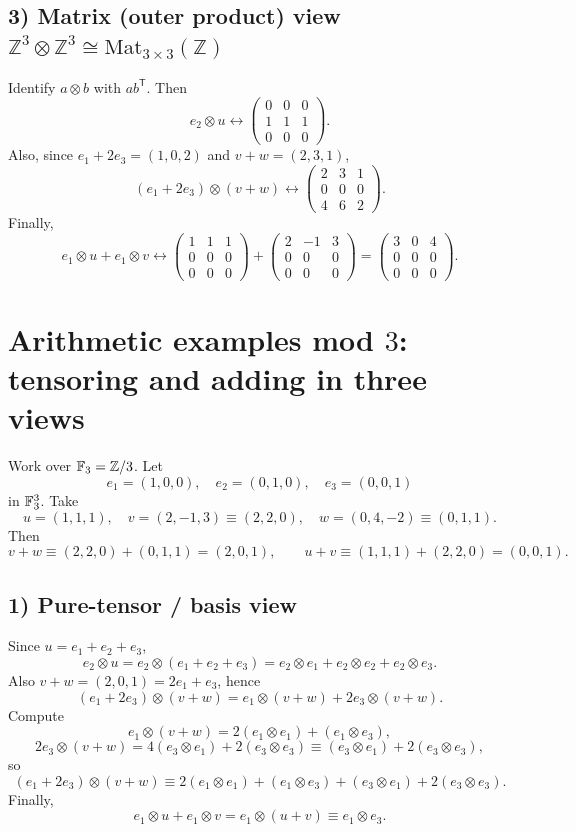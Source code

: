\documentclass[12pt,a4paper]{article}
\theoremstyle{plain}
\theoremstyle{definition}      %
\begin{document}
\subsection*{3) Matrix (outer product) view \(\mathbb Z^3\otimes \mathbb Z^3 \cong \mathrm{Mat}_{3\times 3}(\mathbb Z)\)}
Identify \(a\otimes b\) with \(ab^{\mathsf T}\). Then
\[
e_2\otimes u \leftrightarrow
\begin{pmatrix}
	0&0&0\\
	1&1&1\\
	0&0&0
\end{pmatrix}.
\]
Also, since \(e_1+2e_3=(1,0,2)\) and \(v+w=(2,3,1)\),
\[
(e_1+2e_3)\otimes(v+w)\leftrightarrow
\begin{pmatrix}
	2&3&1\\
	0&0&0\\
	4&6&2
\end{pmatrix}.
\]
Finally,
\[
e_1\otimes u + e_1\otimes v \leftrightarrow
\begin{pmatrix}
	1&1&1\\0&0&0\\0&0&0
\end{pmatrix}
+
\begin{pmatrix}
	2&-1&3\\0&0&0\\0&0&0
\end{pmatrix}
=
\begin{pmatrix}
	3&0&4\\0&0&0\\0&0&0
\end{pmatrix}.
\]

\section*{Arithmetic examples mod \(3\): tensoring and adding in three views}

Work over \(\Bbb F_3=\mathbb Z/3\). Let
\[
e_1=(1,0,0),\quad e_2=(0,1,0),\quad e_3=(0,0,1)
\]
in \(\Bbb F_3^3\). Take
\[
u=(1,1,1),\quad v=(2,-1,3)\equiv(2,2,0),\quad w=(0,4,-2)\equiv(0,1,1).
\]
Then
\[
v+w\equiv(2,2,0)+(0,1,1)=(2,0,1),\qquad
u+v\equiv(1,1,1)+(2,2,0)=(0,0,1).
\]

\subsection*{1) Pure-tensor / basis view}
Since \(u=e_1+e_2+e_3\),
\[
e_2\otimes u
= e_2\otimes(e_1+e_2+e_3)
= e_2\otimes e_1+e_2\otimes e_2+e_2\otimes e_3.
\]
Also \(v+w=(2,0,1)=2e_1+e_3\), hence
\[
(e_1+2e_3)\otimes(v+w)
= e_1\otimes(v+w)+2e_3\otimes(v+w).
\]
Compute
\[
e_1\otimes(v+w)=2(e_1\otimes e_1)+(e_1\otimes e_3),
\]
\[
2e_3\otimes(v+w)=4(e_3\otimes e_1)+2(e_3\otimes e_3)\equiv (e_3\otimes e_1)+2(e_3\otimes e_3),
\]
so
\[
(e_1+2e_3)\otimes(v+w)\equiv
2(e_1\otimes e_1)+(e_1\otimes e_3)+(e_3\otimes e_1)+2(e_3\otimes e_3).
\]
Finally,
\[
e_1\otimes u + e_1\otimes v = e_1\otimes(u+v)\equiv e_1\otimes e_3.
\]
\end{document}

